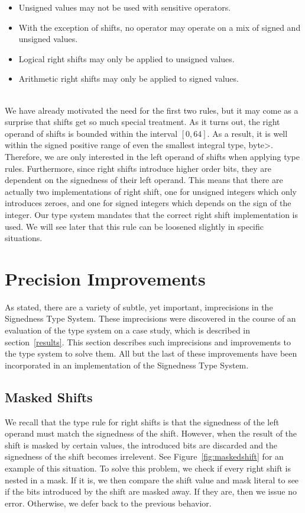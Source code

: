 \begin{itemize}
  \item Unsigned values may not be used with sensitive
    operators.
  \item With the exception of shifts, no operator may operate on a mix of
    signed and unsigned values.
  \item Logical right shifts may only be applied to unsigned values.
  \item Arithmetic right shifts may only be applied to signed values.
\end{itemize}

\noindent\\
We have already motivated the need for the first two rules, but it may come
as a surprise that shifts get so much special treatment. As it turns out,
the right operand of shifts is bounded within the interval $[0, 64]$. As a
result, it is well within the signed positive range of even the smallest
integral type, \<byte>. Therefore, we are only interested in the left operand
of shifts when applying type rules. Furthermore, since right shifts introduce
higher order bits, they are dependent on the signedness of their left operand.
This means that there are actually two implementations of right shift, one for
unsigned integers which only introduces zeroes, and one for signed integers
which depends on the sign of the integer. Our type system mandates that
the correct right shift implementation is used. We will see later that this
rule can be loosened slightly in specific situations.

\newpage
\section{Precision Improvements} \label{precision}

As stated, there are a variety of subtle, yet important, imprecisions in the
Signedness Type System. These imprecisions were discovered in the course of
an evaluation of the type system on a case study, which is described in
section~\ref{results}. This section describes such imprecisions and improvements
to the type system to solve them. All but the last of these improvements have
been incorporated in an implementation of the Signedness Type System.

\subsection{Masked Shifts}
We recall that the type rule for right shifts is that the signedness of the left
operand must match the signedness of the shift. However, when the result of the
shift is masked by certain values, the introduced bits are discarded and the
signedness of the shift becomes irrelevent. See Figure~\ref{fig:maskedshift}
for an example of this situation. To solve this problem, we check if every
right shift is nested in a mask. If it is, we then compare the shift value
and mask literal to see if the bits introduced by the shift are masked away.
If they are, then we issue no error. Otherwise, we defer back to the previous
behavior.

